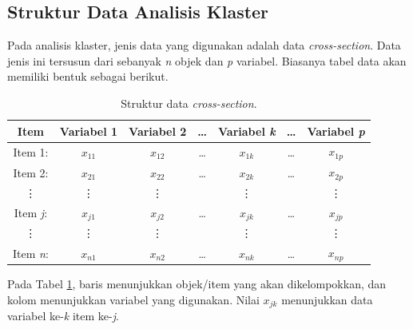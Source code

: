 \subsection{Struktur Data Analisis Klaster}
Pada analisis klaster, jenis data yang digunakan adalah data \textit{cross-section}. Data jenis ini tersusun dari sebanyak \textit{n} objek dan \textit{p} variabel. Biasanya tabel data akan memiliki bentuk sebagai berikut.
\begin{table}[h!]
    \centering
    \begin{tabular}{|c|c|c|c|c|c|c|} \hline
    \textbf{Item} & \textbf{Variabel 1} & \textbf{Variabel 2} & \ldots & \textbf{Variabel \textit{k}} & \ldots & \textbf{Variabel \textit{p}} \\ \hline
    Item 1: & $x_{11}$ & $x_{12}$ & \ldots & $x_{1k}$ & \ldots & $x_{1p}$ \\ \hline
    Item 2: & $x_{21}$ & $x_{22}$ & \ldots & $x_{2k}$ & \ldots & $x_{2p}$ \\ \hline
    \vdots & \vdots & \vdots & & \vdots & & \vdots \\ \hline
    Item \textit{j}: & $x_{j1}$ & $x_{j2}$ & \ldots & $x_{jk}$ & \ldots & $x_{jp}$ \\ \hline
    \vdots & \vdots & \vdots & & \vdots & & \vdots \\ \hline
    Item \textit{n}: & $x_{n1}$ & $x_{n2}$ & \ldots & $x_{nk}$ & \ldots & $x_{np}$ \\ \hline
    \end{tabular}
    \caption{Struktur data \textit{cross-section}.}
    \label{tab:cr}
\end{table}
\par Pada Tabel \ref{tab:cr}, baris menunjukkan objek/item yang akan dikelompokkan, dan kolom menunjukkan variabel yang digunakan. Nilai $x_{jk}$ menunjukkan data variabel ke-\textit{k} item ke-\textit{j}.
